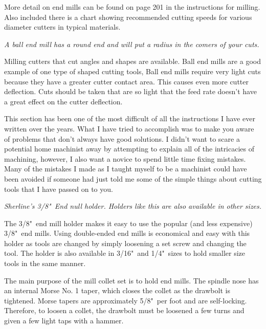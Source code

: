 More detail on end mills can be found on page 201 in the instructions for
milling. Also included there is a chart showing recommended cutting speeds for
various diameter cutters in typical materials.

\bigskip
\textit{A ball end mill has a round end and will put a radius in the comers of
your cuts.}
\bigskip


Milling cutters that cut angles and shapes are available. Ball end mills are a
good example of one type of shaped cutting tools, Ball end mills require very
light cuts because they have a greater cutter contact area. This causes even
more cutter deflection. Cuts should be taken that are so light that the feed
rate doesn't have a great effect on the cutter deflection.

This section has been one of the most difficult of all the instructions I have
ever written over the years. What I have tried to accomplish was to make you
aware of problems that don't always have good solutions. I didn't want to scare
a potential home machinist away by attempting to explain all of the intricacies
of machining, however, I also want a novice to spend little time fixing
mistakes. Many of the mistakes I made as I taught myself to be a machinist could
have been avoided if someone had just told me some of the simple things about
cutting tools that I have passed on to you.

\secdown


\textit{Sherline's 3/8"\ End null holder. Holders like this are also available in
other sizes.}
\bigskip

The 3/8"\ end mill holder makes it easy to use the popular (and less expensive)
3/8"\ end mills. Using double-ended end mills is economical and easy with this
holder as tools are changed by simply loosening a set screw and changing the
tool. The holder is also available in 3/16"\ and 1/4"\ sizes to hold smaller size
tools in the same manner.


The main purpose of the mill collet set is to hold end mills. The spindle nose
has an internal Morse No. 1 taper, which closes the collet as the drawbolt is
tightened. Morse tapers are approximately 5/8"\ per foot and are self-locking.
Therefore, to loosen a collet, the drawbolt must be loosened a few turns and
given a few light taps with a hammer.

